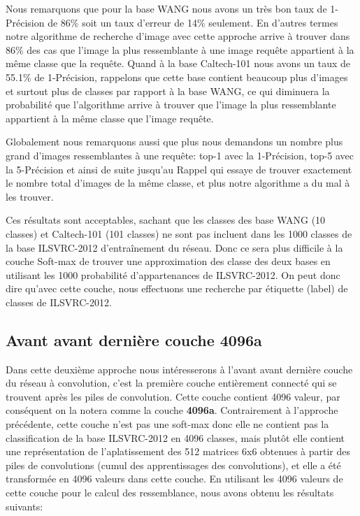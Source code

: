 	Nous remarquons que pour la base WANG nous avons un très bon taux de 1-Précision de 86\% soit un taux d'erreur de 14\% seulement. En d'autres termes notre algorithme de recherche d'image avec cette approche arrive à trouver dans 86\% des cas que l'image la plus ressemblante à une image requête appartient à la même classe que la requête. Quand à la base Caltech-101 nous avons un taux de 55.1\% de 1-Précision, rappelons que cette base contient beaucoup plus d'images et surtout plus de classes par rapport à la base WANG, ce qui diminuera la probabilité que l'algorithme arrive à trouver que l'image la plus ressemblante appartient à la même classe que l'image requête.
	
	Globalement nous remarquons aussi que plus nous demandons un nombre plus grand d'images ressemblantes à une requête: top-1 avec la 1-Précision, top-5 avec la 5-Précision et ainsi de suite jusqu'au Rappel qui essaye de trouver exactement le nombre total d'images de la même classe, et plus notre algorithme a du mal à les trouver.

	Ces résultats sont acceptables, sachant que les classes des base WANG (10 classes) et Caltech-101 (101 classes) ne sont pas incluent dans les 1000 classes de la base ILSVRC-2012 d’entraînement du réseau. Donc ce sera plus difficile à la couche Soft-max de trouver une approximation des classe des deux bases en utilisant les 1000 probabilité d'appartenances de ILSVRC-2012.
	On peut donc dire qu'avec cette couche, nous effectuons une recherche par étiquette (label) de classes de ILSVRC-2012. 





\subsection{Avant avant dernière couche 4096a} 
	Dans cette deuxième approche nous intéresserons à l'avant avant dernière couche du réseau à convolution, c'est la première couche entièrement connecté qui se trouvent après les piles de convolution. Cette couche contient 4096 valeur, par conséquent on la notera comme la couche \textbf{4096a}.
	Contrairement à l'approche précédente, cette couche n'est pas une soft-max donc elle ne contient pas la classification de la base ILSVRC-2012 en 4096 classes, mais plutôt elle contient une représentation de l’aplatissement des 512 matrices 6x6 obtenues à partir des piles de convolutions (cumul des apprentissages des convolutions), et elle a été transformée en 4096 valeurs dans cette couche. En utilisant les 4096 valeurs de cette couche pour le calcul des ressemblance, nous avons obtenu les résultats suivants:

